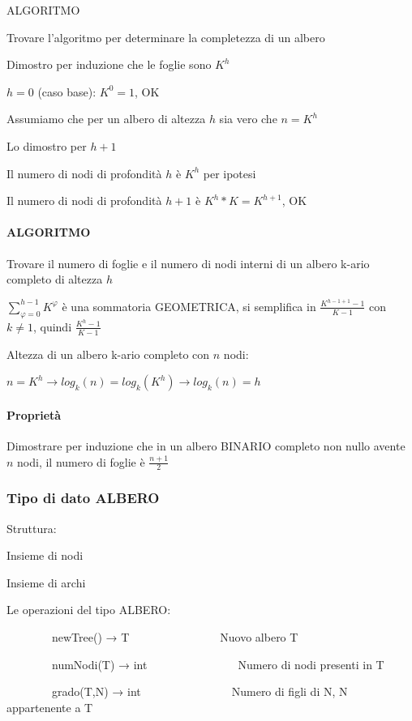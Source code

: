 \documentclass{article}
\let\oldparagraph\paragraph
\renewcommand{\paragraph}[1]{\oldparagraph{#1}\mbox{}}
\begin{document}
{{{{ALGORITMO}

{Trovare l'algoritmo per determinare la completezza di un albero}

{Dimostro per induzione che le foglie sono $K^h$}


{$h=0$ (caso base): $K^0=1$, OK}

{Assumiamo che per un albero di altezza $h$ sia vero che $n=K^h$}

{Lo dimostro per $h+1$}

{Il numero di nodi di profondità $h$ è $K^h$ per ipotesi}

{Il numero di nodi di profondità $h+1$ è $K^h*K=K^{h+1}$, OK}

\paragraph{ALGORITMO}

{Trovare il numero di foglie e il numero di nodi interni di un albero k-ario completo di altezza $h$}

{$\sum_{\varphi=0}^{h-1}{K^{\varphi}}$ è una sommatoria GEOMETRICA, si semplifica in $\frac{K^{h-1+1}-1}{K-1}$ con $k\neq 1$, quindi $\frac{K^h-1}{K-1}$}

{Altezza di un albero k-ario completo con $n$ nodi:}

$n=K^h \rightarrow log_k(n) = log_k(K^h) \rightarrow log_k(n) = h$

\paragraph{Proprietà}

{Dimostrare per induzione che in un albero BINARIO completo non nullo avente $n$ nodi, il numero di foglie è $\frac{n+1}{2}$}

\subsubsection{Tipo di dato ALBERO}

{Struttura:}

{Insieme di nodi}

{Insieme di archi}


{Le operazioni del tipo ALBERO:}


{~~~~~~~~newTree() → T~~~~~~~~~~~~~~~~Nuovo albero T}

{~~~~~~~~numNodi(T) → int~~~~~~~~~~~~~~~~Numero di nodi presenti in T}

{~~~~~~~~grado(T,N) → int~~~~~~~~~~~~~~~~Numero di figli di N, N
appartenente a T}

}}}
\end{document}
